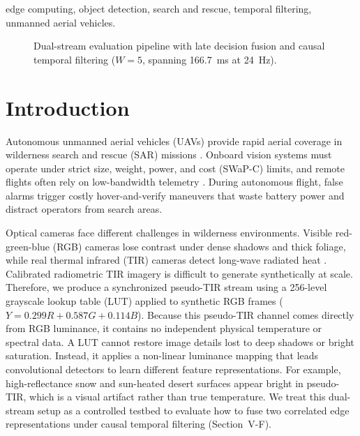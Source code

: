 \documentclass[conference]{IEEEtran}
\begin{document}
\begin{IEEEkeywords}
edge computing, object detection, search and rescue, temporal filtering, unmanned aerial vehicles.
\end{IEEEkeywords}

\begin{figure}[!t]
\centering
\resizebox{1.0\textwidth}{!}{}
\caption{Dual-stream evaluation pipeline with late decision fusion and causal temporal filtering ($W=5$, spanning 166.7~ms at 24~Hz).}
\label{fig:system_architecture}
\end{figure}

\section{Introduction}

Autonomous unmanned aerial vehicles (UAVs) provide rapid aerial coverage in wilderness search and rescue (SAR) missions \cite{rudol2008human,silvagni2016multipurpose}. Onboard vision systems must operate under strict size, weight, power, and cost (SWaP-C) limits, and remote flights often rely on low-bandwidth telemetry \cite{kyrkou2020emergencynet}. During autonomous flight, false alarms trigger costly hover-and-verify maneuvers that waste battery power and distract operators from search areas.

Optical cameras face different challenges in wilderness environments. Visible red-green-blue (RGB) cameras lose contrast under dense shadows and thick foliage, while real thermal infrared (TIR) cameras detect long-wave radiated heat \cite{hwang2015multispectral,jia2021llvip}. Calibrated radiometric TIR imagery is difficult to generate synthetically at scale. Therefore, we produce a synchronized pseudo-TIR stream using a 256-level grayscale lookup table (LUT) applied to synthetic RGB frames ($Y = 0.299R + 0.587G + 0.114B$). Because this pseudo-TIR channel comes directly from RGB luminance, it contains no independent physical temperature or spectral data. A LUT cannot restore image details lost to deep shadows or bright saturation. Instead, it applies a non-linear luminance mapping that leads convolutional detectors to learn different feature representations. For example, high-reflectance snow and sun-heated desert surfaces appear bright in pseudo-TIR, which is a visual artifact rather than true temperature. We treat this dual-stream setup as a controlled testbed to evaluate how to fuse two correlated edge representations under causal temporal filtering (Section~V-F).
\end{document}
